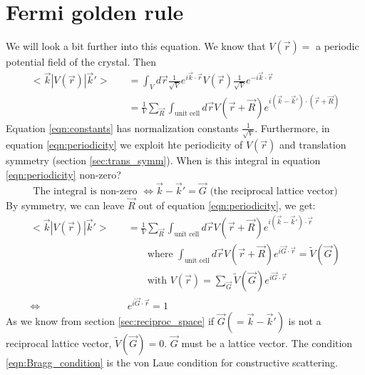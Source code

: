 \section{Fermi golden rule}
We will look a bit further into this equation. We know that $V(\vec{r})=$ a periodic potential field of the crystal. Then
\begin{align}
	<\vec{k}|V(\vec{r})|\vec{k}'> \quad &= \int_{V}^{}d\vec{r}\frac{1}{\sqrt{V}}e^{i\vec{k}\cdot\vec{r}}V(\vec{r})\frac{1}{\sqrt{V}}e^{-i\vec{k}\cdot\vec{r}} \label{eqn:constants}\\
	&= \frac{1}{V}\sum_{\vec{R}}^{}\int_{\text{unit cell}}^{}d\vec{r}V(\vec{r}+\vec{R})e^{i(\vec{k}-\vec{k}')\cdot(\vec{r}+\vec{R})} \label{eqn:periodicity}
\end{align}
Equation \ref{eqn:constants} has normalization constants $\frac{1}{\sqrt{V}}$. Furthermore, in equation \ref{eqn:periodicity} we exploit hte periodicity of $V(\vec{r})$ and translation symmetry (section \ref{sec:trans_symm}). When is this integral in equation \ref{eqn:periodicity} non-zero?
\begin{equation}
	\text{The integral is non-zero } \iff \vec{k} - \vec{k}' = \vec{G} \text{ (the reciprocal lattice vector)} \label{eqn:Bragg_condition}
\end{equation}
By symmetry, we can leave $\vec{R}$ out of equation \ref{eqn:periodicity}, we get:
\begin{align}
	<\vec{k}|V(\vec{r})|\vec{k}'> \quad &= \frac{1}{V}\sum_{\vec{R}}^{}\int_{\text{unit cell}}^{}d\vec{r}V(\vec{r}+\vec{R})e^{i(\vec{k}-\vec{k}')\cdot\vec{r}}\\
	&\qquad\text{where } \int_{\text{unit cell}}^{}d\vec{r}V(\vec{r}+\vec{R})e^{i\vec{G}\cdot\vec{r}} = \tilde{V}(\vec{G})\\
	&\qquad\text{with } V(\vec{r}) = \sum_{\vec{G}}^{}\tilde{V}(\vec{G})e^{i\vec{G}\cdot\vec{r}}\\
	\iff & e^{i\vec{G}\cdot\vec{r}} = 1
\end{align}
As we know from section \ref{sec:reciproc_space} if $\vec{G} (= \vec{k} - \vec{k}')$ is not a reciprocal lattice vector, $\tilde{V}(\vec{G}) = 0$. $\vec{G}$ must be a lattice vector. The condition \ref{eqn:Bragg_condition} is the von Laue condition for constructive scattering.\par
